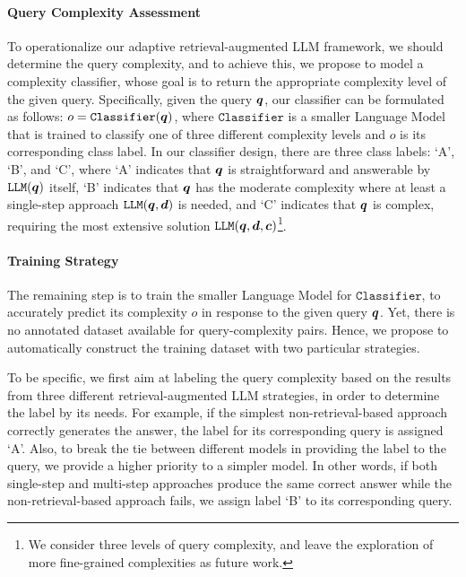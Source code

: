 \paragraph{Query Complexity Assessment}
To operationalize our adaptive retrieval-augmented LLM framework, we should determine the query complexity, and to achieve this, we propose to model a complexity classifier, whose goal is to return the appropriate complexity level of the given query. Specifically, given the query ${\bm{q}}$, our classifier can be formulated as follows: $o = \texttt{Classifier}({\bm{q}})$, where $\texttt{Classifier}$ is a smaller Language Model that is trained to classify one of three different complexity levels and $o$ is its corresponding class label. In our classifier design, there are three class labels: `A', `B', and `C', where `A' indicates that ${\bm{q}}$ is straightforward and answerable by $\texttt{LLM}({\bm{q}})$ itself, `B' indicates that ${\bm{q}}$ has the moderate complexity where at least a single-step approach $\texttt{LLM}({\bm{q}}, {\bm{d}})$ is needed, and `C' indicates that ${\bm{q}}$ is complex, requiring the most extensive solution $\texttt{LLM}({\bm{q}}, {\bm{d}}, {\bm{c}})$\footnote{We consider three levels of query complexity, and leave the exploration of more fine-grained complexities as future work.}.



\paragraph{Training Strategy}
The remaining step is to train the smaller Language Model for $\texttt{Classifier}$, to accurately predict its complexity $o$ in response to the given query ${\bm{q}}$. Yet, there is no annotated dataset available for query-complexity pairs. Hence, we propose to automatically construct the training dataset with two particular strategies. 

To be specific, we first aim at labeling the query complexity based on the results from three different retrieval-augmented LLM strategies, in order to determine the label by its needs. For example, if the simplest non-retrieval-based approach correctly generates the answer, the label for its corresponding query is assigned `A'. Also, to break the tie between different models in providing the label to the query, we provide a higher priority to a simpler model. In other words, if both single-step and multi-step approaches produce the same correct answer while the non-retrieval-based approach fails, we assign label `B' to its corresponding query. 

